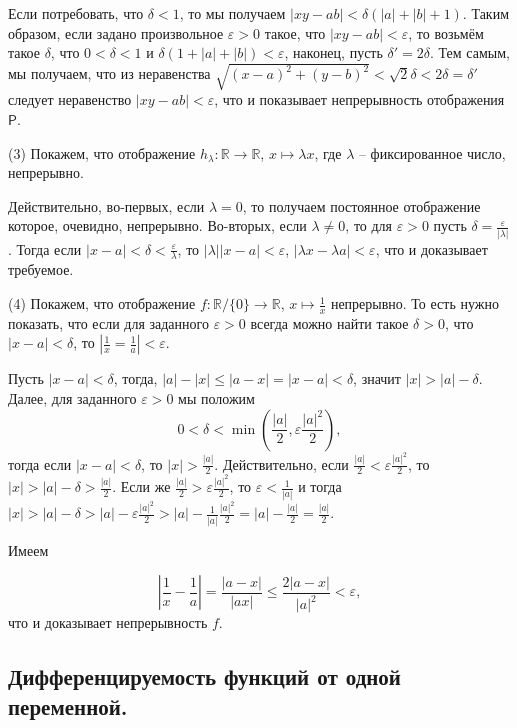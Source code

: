 Если потребовать, что $\delta <1$, то мы получаем $|xy-ab| < \delta (|a| + |b|+1).$ Таким образом, если задано произвольное $\varepsilon >0$ такое, что $|xy -ab| < \varepsilon$, то возьмём такое $\delta$, что $0 < \delta <1$ и $\delta(1 + |a| + |b|)<\varepsilon$, наконец, пусть $\delta' = 2{\delta}$. Тем самым, мы получаем, что из неравенства $\sqrt{(x-a)^2 + (y-b)^2} < \sqrt{2}\delta < 2 \delta = \delta'$ следует неравенство $|xy - ab| < \varepsilon$, что и показывает непрерывность отображения $\mathsf{P}.$

(3) Покажем, что отображение $h_\lambda: \mathbb{R} \to \mathbb{R}$, $x \mapsto \lambda x$, где $\lambda$ -- фиксированное число, непрерывно. 

Действительно, во-первых, если $\lambda  =0$, то получаем постоянное отображение которое, очевидно, непрерывно. Во-вторых, если $\lambda \ne 0$, то для $\varepsilon >0$ пусть $\delta = \frac{\varepsilon}{|\lambda|}$. Тогда если $|x-a|<\delta < \frac{\varepsilon}{\lambda}$, то $|\lambda||x-a| < \varepsilon$, \ie $|\lambda x - \lambda a| < \varepsilon$, что и доказывает требуемое.

(4) Покажем, что отображение $f:\mathbb{R}/\{0\} \to \mathbb{R}$, $x \mapsto \frac{1}{x}$ непрерывно. То есть нужно показать, что если для заданного $\varepsilon>0$ всегда можно найти такое $\delta>0$, что $|x-a|<\delta$, то $|\frac{1}{x} = \frac{1}{a}|<\varepsilon.$

Пусть $|x-a|<\delta$, тогда, $|a| - |x| \le |a-x| = |x-a| < \delta$, значит $|x|>|a| -\delta$. Далее, для заданного $\varepsilon>0$ мы положим 
\[
0<\delta < \min \left( \frac{|a|}{2}, \varepsilon\frac{|a|^2}{2} \right),
\]
тогда если $|x-a|< \delta$, то $|x|>\frac{|a|}{2}$. Действительно, если $\frac{|a|}{2}< \varepsilon\frac{|a|^2}{2}$, то $|x| > |a| - \delta > \frac{|a|}{2}$. Если же $\frac{|a|}{2}> \varepsilon\frac{|a|^2}{2}$, то $\varepsilon < \frac{1}{|a|}$ и тогда $|x|  > |a| - \delta > |a| -\varepsilon \frac{|a|^2}{2} > |a| -  \frac{1}{|a|}\frac{|a|^2}{2} = |a| - \frac{|a|}{2} = \frac{|a|}{2}.$

Имеем

\[
 \left| \frac{1}{x} - \frac{1}{a} \right| = \frac{|a-x|}{|ax|} \le \frac{2 |a-x|}{|a|^2} < \varepsilon,
\]
что и доказывает непрерывность $f$.





\subsection{Дифференцируемость функций от одной переменной.}

